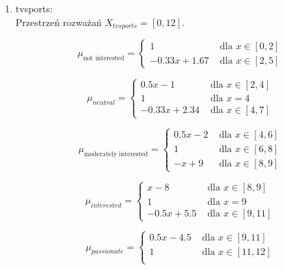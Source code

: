 \documentclass{classrep}
\begin{document}
\begin{enumerate}
  \item tvsports: \\
  Przestrzeń rozważań $X_{tvsports} = [0,12]$. 

  \begin{equation}
    \mu_{\text{not interested}} =
      \begin{cases}
        1 & \text{ dla } x \in [0,2] \\
        -0.33x+1.67 & \text{ dla } x \in [2,5]       
      \end{cases}  
  \end{equation}

  \begin{equation}
    \mu_{neutral} =
      \begin{cases}
        0.5x-1 & \text{ dla } x \in [2,4]\\
        1 & \text{ dla } x=4 \\
        -0.33x+2.34 & \text{ dla } x \in [4,7]       
      \end{cases}  
  \end{equation}

  \begin{equation}
    \mu_{\text{moderately interested}} =
      \begin{cases}
        0.5x-2 & \text{ dla } x \in [4,6]\\
        1 & \text{ dla } x \in [6,8] \\
        -x+9 & \text{ dla } x \in [8,9]       
      \end{cases}  
  \end{equation}

  \begin{equation}
    \mu_{interested} =
      \begin{cases}
        x-8 & \text{ dla } x \in [8,9]\\
        1 & \text{ dla } x =9 \\
        -0.5x+5.5 & \text{ dla } x \in [9,11]       
      \end{cases}  
  \end{equation}

  \begin{equation}
    \mu_{passionate} =
      \begin{cases}
        0.5x-4.5 & \text{ dla } x \in [9,11]\\
        1 & \text{ dla } x \in [11,12] \\
     
      \end{cases}  
  \end{equation}


\end{enumerate}
\end{document}

